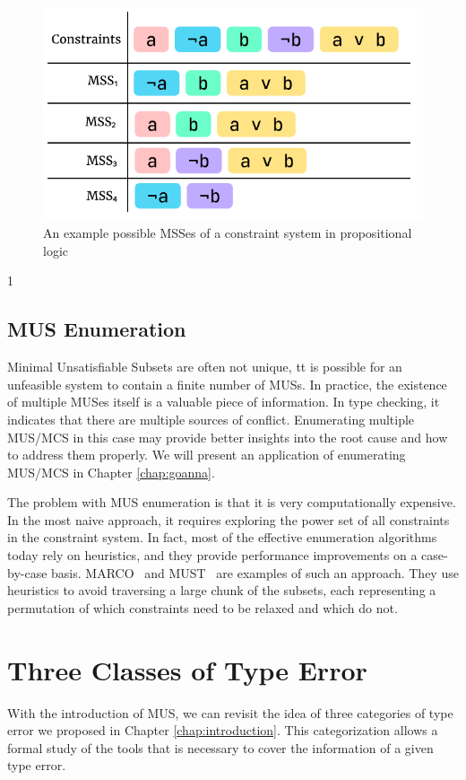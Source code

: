 \begin{figure}[hbt]
  \includegraphics[width=0.8\linewidth]{MSS}
  \caption{
    \label{fig:mss-example}
      An example possible MSSes of a constraint system in propositional logic}
\end{figure}1

\subsection{MUS Enumeration}
 Minimal Unsatisfiable Subsets are often not unique, tt is possible for an unfeasible system to contain a finite number of MUSs. In practice, the existence of multiple MUSes itself is a valuable piece of information. In type checking, it indicates that there are multiple sources of conflict. Enumerating multiple MUS/MCS in this case may provide better insights into the root cause and how to address them properly. We will present an application of enumerating MUS/MCS in Chapter \ref{chap:goanna}.

The problem with MUS enumeration is that it is very computationally expensive. In the most naive approach, it requires exploring the power set of all constraints in the constraint system. In fact, most of the effective enumeration algorithms today rely on heuristics, and they provide performance improvements on a case-by-case basis. MARCO~\cite{Liffiton2016-xi} and MUST~\cite{Bendik2020-pz} are examples of such an approach. They use heuristics to avoid traversing a large chunk of the subsets, each representing a permutation of which constraints need to be relaxed and which do not.



\section{Three Classes of Type Error}
With the introduction of MUS, we can revisit the idea of three categories of type error we proposed in Chapter \ref{chap:introduction}. This categorization allows a formal study of the tools that is necessary to cover the information of a given type error. 

